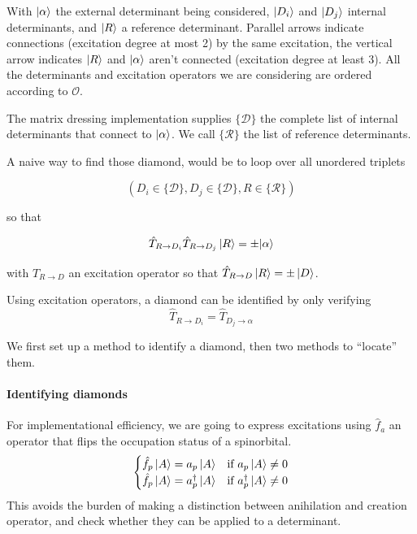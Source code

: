 \documentclass[./thesis.tex]{subfiles}
\begin{document}
With ${\ket{\alpha}}$ the external determinant being considered, $\ket {D_i}$ and $\ket {D_j}$ internal determinants, and $\ket R$ a reference determinant.  Parallel arrows indicate connections (excitation degree at most 2) by the same excitation, the vertical arrow indicates $\ket R$ and ${\ket{\alpha}}$ aren't connected (excitation degree at least 3). All the determinants and excitation operators we are considering are ordered according to $\mathcal{O}$.

The matrix dressing implementation supplies $\{\mathcal{D}\}$ the complete list of internal determinants that connect to ${\ket{\alpha}}$. We call $\{\mathcal{R}\}$ the list of reference determinants.

A naive way to find those diamond, would be to loop over all unordered triplets 

\begin{equation}
(D_i \in \{\mathcal{D}\}, D_j \in \{\mathcal{D}\}, R \in \{\mathcal{R}\})
\end{equation}

so that

\begin{equation}
\hat T_{R \rightarrow D_i} \hat T_{R \rightarrow D_j} \ket R = \pm {\ket{\alpha}}
\end{equation}

with $\hat T_{R \rightarrow D}$ an excitation operator so that $\hat T_{R \rightarrow D} \ket R = \pm \ket D$.



Using excitation operators, a diamond can be identified by only verifying
\begin{equation}
\hat T_{R \rightarrow D_i} = \hat T_{D_j \rightarrow \alpha}
\label{eq:excitation_diamond}
\end{equation}


We first set up a method to identify a diamond, then two methods to ``locate'' them.


\paragraph{Identifying diamonds}
For implementational efficiency, we are going to express excitations using $\hat f_a$ an operator that flips the occupation status of a spinorbital. 
\begin{align}
  \begin{cases}
  \hat f_p \ket A = a_p \ket A & \text{if }  a_p \ket A \neq 0\\
  \hat f_p \ket A = a^\dagger_p \ket A & \text{if }  a^\dagger_p  \ket A \neq 0\\
  \end{cases}
\end{align}
This avoids the burden of making a distinction between anihilation and creation operator, and check whether they can be applied to a determinant.
\end{document}
